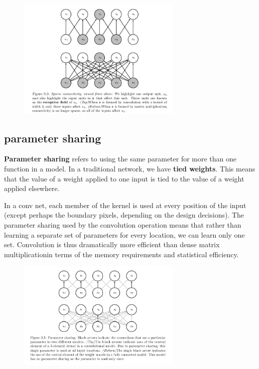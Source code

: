 \documentclass[onecolumn, letterpaper, 12pt]{report}
\begin{document}
\begin{figure}[h]
  \centering
  \includegraphics[width=0.7\textwidth]{sparse_connectivity.png}
\end{figure}

\subsection{parameter sharing}

\textbf{Parameter sharing} refers to using the same parameter for more than one function in a model. In a traditional network, we have \textbf{tied weights}. This means that the value of a weight applied to one input is tied to the value of a weight applied elsewhere. 

In a conv net, each member of the kernel is used at every position of the input (except perhaps the boundary pixels, depending on the design decisions). The parameter sharing used by the convolution operation means that rather than learning a separate set of parameters for every location, we can learn only one set. Convolution is thus dramatically more efficient than dense matrix multiplicationin terms of the memory requirements and statistical efficiency. 

\begin{figure}[h]
  \centering
  \includegraphics[width=0.7\textwidth]{param_sharing.png}
\end{figure}
\end{document}
